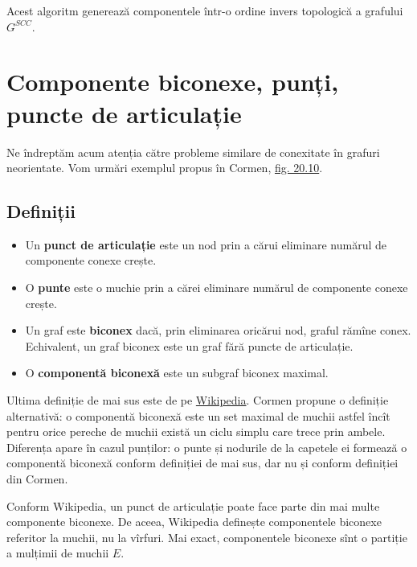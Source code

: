 \documentclass[../main.tex]{subfiles}
\begin{document}
Acest algoritm generează componentele într-o ordine invers topologică a grafului $G^{SCC}$.

\section{Componente biconexe, punți, puncte de articulație}

Ne îndreptăm acum atenția către probleme similare de conexitate în grafuri neorientate. Vom urmări exemplul propus în Cormen, \href{https://dl.ebooksworld.ir/books/Introduction.to.Algorithms.4th.Leiserson.Stein.Rivest.Cormen.MIT.Press.9780262046305.EBooksWorld.ir.pdf#page=604}{fig. 20.10}.

\subsection{Definiții}

\begin{itemize}
  \item Un \textbf{punct de articulație} este un nod prin a cărui eliminare numărul de componente conexe crește.

  \item O \textbf{punte} este o muchie prin a cărei eliminare numărul de componente conexe crește.

  \item Un graf este \textbf{biconex} dacă, prin eliminarea oricărui nod, graful rămîne conex. Echivalent, un graf biconex este un graf fără puncte de articulație.

  \item O \textbf{componentă biconexă} este un subgraf biconex maximal.
\end{itemize}

Ultima definiție de mai sus este de pe \href{https://en.wikipedia.org/wiki/Biconnected_component}{Wikipedia}. Cormen propune o definiție alternativă: o componentă biconexă este un set maximal de muchii astfel încît pentru orice pereche de muchii există un ciclu simplu care trece prin ambele. Diferența apare în cazul punților: o punte și nodurile de la capetele ei formează o componentă biconexă conform definiției de mai sus, dar nu și conform definiției din Cormen.

Conform Wikipedia, un punct de articulație poate face parte din mai multe componente biconexe. De aceea, Wikipedia definește componentele biconexe referitor la muchii, nu la vîrfuri. Mai exact, componentele biconexe sînt o partiție a mulțimii de muchii $E$.
\end{document}
